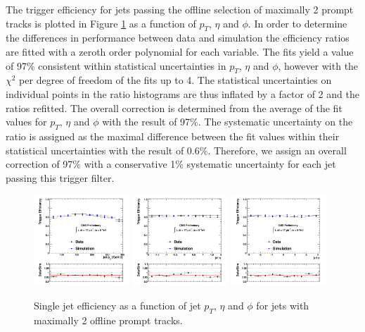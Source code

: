 The trigger efficiency for jets passing the offline selection of maximally 2 prompt tracks 
is plotted in Figure \ref{fig:eff2Trksptetaphi}
 as a function of $p_T$, $\eta$ and $\phi$. In order to determine the differences in performance 
between data and simulation the efficiency ratios are fitted with a zeroth order polynomial for each variable.
The fits yield a value of 97\% consistent within statistical uncertainties in $p_T$, $\eta$ and $\phi$,
 however with the $\chi^2$ per degree of freedom of the fits up to 4. 
The statistical uncertainties on individual points in the ratio histograms
are thus inflated by a factor of 2 and the ratios refitted.
 The overall correction is determined from the average of the fit values for
$p_T$, $\eta$ and $\phi$ with the result of 97\%. The systematic uncertainty on the ratio 
is assigned as the maximal
difference between the fit values within their statistical uncertainties with the result of 0.6\%.
Therefore, we assign an overall correction of 97\% with a conservative 1\% systematic uncertainty for 
each jet passing this trigger filter. 
 
 
\begin{figure}[!h]
\centering
 \includegraphics[width=0.32\textwidth]{plots/trigger/effHT300_2Trk_Pt.pdf}
 \includegraphics[width=0.32\textwidth]{plots/trigger/effHT300_2Trk_Eta.pdf}
 \includegraphics[width=0.32\textwidth]{plots/trigger/effHT300_2Trk_Phi.pdf}
\caption{Single jet efficiency as a function of jet $p_T$, $\eta$ and $\phi$ for jets with maximally 2 offline prompt tracks. \label{fig:eff2Trksptetaphi}}
\end{figure}

